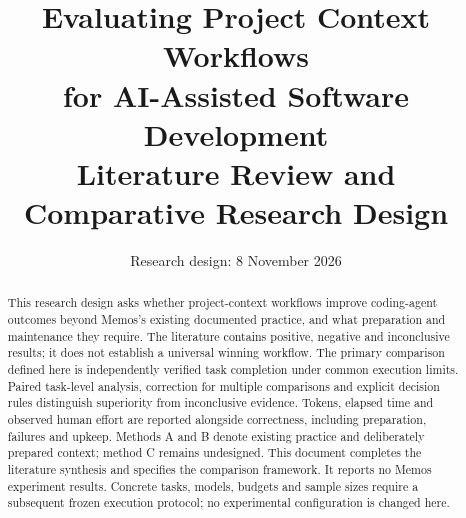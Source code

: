 \documentclass[11pt,a4paper]{article}
\title{Evaluating Project Context Workflows\\for AI-Assisted Software Development\\[4pt]\large Literature Review and Comparative Research Design}
\author{}
\date{Research design: 8 November 2026}
\begin{document}
\maketitle
\begin{abstract}
This research design asks whether project-context workflows improve coding-agent
outcomes beyond Memos's existing documented practice, and what preparation and
maintenance they require. The literature contains positive, negative and
inconclusive results; it does not establish a universal winning workflow.
The primary comparison defined here is independently verified task completion
under common execution limits. Paired task-level analysis, correction for
multiple comparisons and explicit decision rules distinguish superiority from
inconclusive evidence. Tokens, elapsed time and observed human effort are
reported alongside correctness, including preparation, failures and upkeep.
Methods A and B denote existing practice and deliberately prepared context;
method C remains undesigned. This document completes the literature synthesis
and specifies the comparison framework. It reports no Memos experiment results.
Concrete tasks, models, budgets and sample sizes require a subsequent frozen
execution protocol; no experimental configuration is changed here.
\end{abstract}






\end{document}
